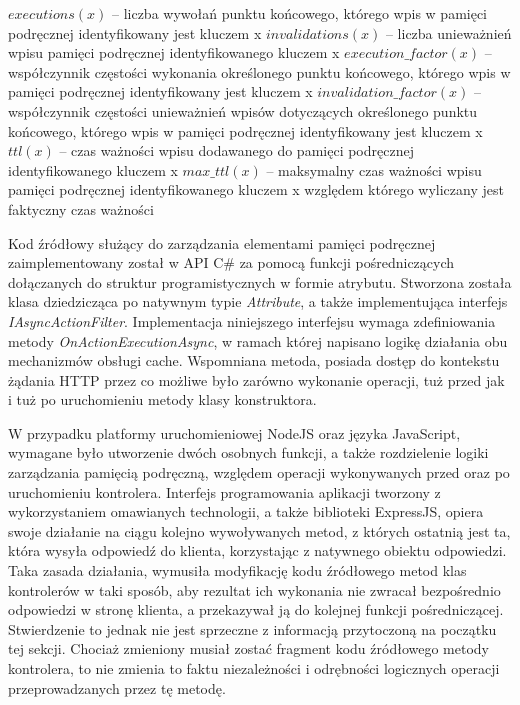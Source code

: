 \noindent $executions(x)$ -- liczba wywołań punktu końcowego, którego wpis w pamięci podręcznej identyfikowany jest kluczem x \newline
$invalidations(x)$ -- liczba unieważnień wpisu pamięci podręcznej identyfikowanego kluczem x \newline
$execution\_factor(x)$ -- współczynnik częstości wykonania określonego punktu końcowego, którego wpis w pamięci podręcznej identyfikowany jest kluczem x \newline
$invalidation\_factor(x)$ -- współczynnik częstości unieważnień wpisów dotyczących określonego punktu końcowego, którego wpis w pamięci podręcznej identyfikowany jest kluczem x \newline
$ttl(x)$ -- czas ważności wpisu dodawanego do pamięci podręcznej identyfikowanego kluczem x \newline
$max\_ttl(x)$ -- maksymalny czas ważności wpisu pamięci podręcznej identyfikowanego kluczem x względem którego wyliczany jest faktyczny czas ważności \newline

Kod źródłowy służący do zarządzania elementami pamięci podręcznej zaimplementowany został w API C\# za pomocą funkcji pośredniczących dołączanych do struktur programistycznych w formie atrybutu. Stworzona została klasa dziedzicząca po natywnym typie \textit{Attribute}, a także implementująca interfejs \textit{IAsyncActionFilter}. Implementacja niniejszego interfejsu wymaga zdefiniowania metody \textit{OnActionExecutionAsync}, w ramach której napisano logikę działania obu mechanizmów obsługi cache. Wspomniana metoda, posiada dostęp do kontekstu żądania HTTP przez co możliwe było zarówno wykonanie operacji, tuż przed jak i tuż po uruchomieniu metody klasy konstruktora.

W przypadku platformy uruchomieniowej NodeJS oraz języka JavaScript, wymagane było utworzenie dwóch osobnych funkcji, a także rozdzielenie logiki zarządzania pamięcią podręczną, względem operacji wykonywanych przed oraz po uruchomieniu kontrolera. Interfejs programowania aplikacji tworzony z wykorzystaniem omawianych technologii, a także biblioteki ExpressJS, opiera swoje działanie na ciągu kolejno wywoływanych metod, z których ostatnią jest ta, która wysyła odpowiedź do klienta, korzystając z natywnego obiektu odpowiedzi. Taka zasada działania, wymusiła modyfikację kodu źródłowego metod klas kontrolerów w taki sposób, aby rezultat ich wykonania nie zwracał bezpośrednio odpowiedzi w stronę klienta, a przekazywał ją do kolejnej funkcji pośredniczącej. Stwierdzenie to jednak nie jest sprzeczne z informacją przytoczoną na początku tej sekcji. Chociaż zmieniony musiał zostać fragment kodu źródłowego metody kontrolera, to nie zmienia to faktu niezależności i odrębności logicznych operacji przeprowadzanych przez tę metodę.

